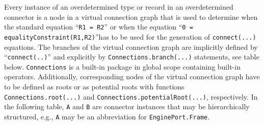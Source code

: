 Every instance of an overdetermined type or record in an overdetermined
connector is a node in a virtual connection graph that is used to
determine when the standard equation ``\lstinline!R1 = R2!'' or when the equation
``\lstinline!0 = equalityConstraint(R1,R2)!''has to be used for the generation of
\lstinline!connect(...)! equations. The branches of the virtual connection graph are
implicitly defined by ``\lstinline!connect(..)!'' and explicitly by
\lstinline!Connections.branch(...)! statements, see table below. \lstinline!Connections! is a
built-in package in global scope containing built-in operators.
Additionally, corresponding nodes of the virtual connection graph have
to be defined as roots or as potential roots with functions
\lstinline!Connections.root(...)! and \lstinline!Connections.potentialRoot(...)!, respectively.
In the following table, \lstinline!A! and \lstinline!B! are connector instances that may be
hierarchically structured, e.g., \lstinline!A! may be an abbreviation for
\lstinline!EnginePort.Frame!.

